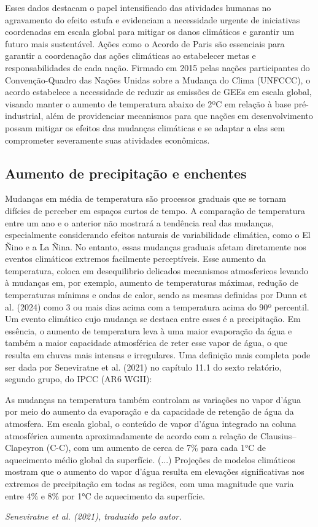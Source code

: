 Esses dados destacam o papel intensificado das atividades humanas no agravamento do efeito estufa e evidenciam a
necessidade urgente de iniciativas coordenadas em escala global para mitigar os danos climáticos e garantir um futuro
mais sustentável. Ações como o Acordo de Paris são essenciais para garantir a coordenação das ações climáticas ao
estabelecer metas e responsabilidades de cada nação. Firmado em 2015 pelas nações participantes do Convenção-Quadro das
Nações Unidas sobre a Mudança do Clima (UNFCCC), o acordo estabelece a necessidade de reduzir as emissões de GEEs em
escala global, visando manter o aumento de temperatura abaixo de 2ºC em relação à base pré-industrial, além de
providenciar mecanismos para que nações em desenvolvimento possam mitigar os efeitos das mudanças climáticas e se
adaptar a elas sem comprometer severamente suas atividades econômicas.

\subsection{Aumento de precipitação e enchentes}
Mudanças em média de temperatura são processos graduais que se tornam difícies de perceber em espaços curtos de tempo. A
comparação de temperatura entre um ano e o anterior não mostrará a tendência real das mudanças, especialmente
considerando efeitos naturais de variabilidade climática, como o El Ñino e a La Ñina. No entanto, essas mudanças
graduais afetam diretamente nos eventos climáticos extremos facilmente perceptíveis. Esse aumento da temperatura, coloca
em desequilibrio delicados mecanismos atmosfericos levando à mudanças em, por exemplo, aumento de temperaturas máximas,
redução de temperaturas mínimas e ondas de calor, sendo as mesmas definidas por Dunn et al. (2024) \cite{dunn} como 3 ou
mais dias acima com a temperatura acima do 90º percentil. Um evento climático cujo mudança se destaca entre esses é a
precipitação. Em essência, o aumento de temperatura leva à uma maior evaporação da água e também a maior capacidade
atmosférica de reter esse vapor de água, o que resulta em chuvas mais intensas e irregulares. Uma definição mais
completa pode ser dada por Seneviratne et al. (2021) no capítulo 11.1 do sexto relatório, segundo grupo, do IPCC (AR6
WGII): 

\begin{citacao}
As mudanças na temperatura também controlam as variações no vapor d'água por meio do aumento da evaporação e da
capacidade de retenção de água da atmosfera. Em escala global, o conteúdo de vapor d'água integrado na coluna
atmosférica aumenta aproximadamente de acordo com a relação de Clausius–Clapeyron (C-C), com um aumento de cerca de 7\%
para cada 1°C de aquecimento médio global da superfície. (...) Projeções de modelos climáticos mostram que o aumento do
vapor d'água resulta em elevações significativas nos extremos de precipitação em todas as regiões, com uma magnitude que
varia entre 4\% e 8\% por 1°C de aquecimento da superfície.

\textit{Seneviratne et al. (2021)\cite{ipcc_ar6_wg2_chap11}, traduzido pelo autor.}

\end{citacao}

